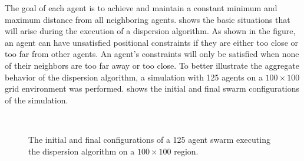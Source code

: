 The goal of each agent is to achieve and maintain a constant minimum and maximum distance from all neighboring agents.   shows the basic situations that will arise during the execution of a dispersion algorithm.  As shown in the figure, an agent can have unsatisfied positional constraints if they are either too close or too far from other agents.  An agent's constraints will only be satisfied when none of their neighbors are too far away or too close.  To better illustrate the aggregate behavior of the dispersion algorithm, a simulation with 125 agents on a $100 \times 100$ grid environment was performed.    shows the initial and final swarm configurations of the simulation.  

\begin{figure}[ht]
	\centering
	\qquad	
	\\
	
\caption[A 125 agent swarm executing the dispersion algorithm.]{The initial and final configurations of a 125 agent swarm executing the dispersion algorithm on a $100 \times 100$ region.}
\label{fig:DispersionBeforeAfter}
\end{figure}

